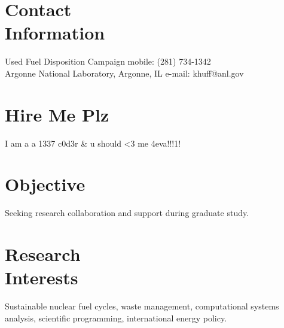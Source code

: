 \documentclass[margin,line]{resume}
\begin{document}
\begin{resume}

    \section{\mysidestyle Contact\\Information}

    Used Fuel Disposition Campaign                          \hfill mobile: (281) 734-1342           \vspace{0mm}\\\vspace{0mm}%
    Argonne National Laboratory, Argonne, IL                \hfill e-mail: khuff@anl.gov            \vspace{0mm}\\\vspace{-4.5mm}%

    \section{\mysidestyle Hire Me Plz}
        I am a a 1337 c0d3r & u should <3 me 4eva!!!1!

    \section{\mysidestyle Objective}
		Seeking research collaboration and support during graduate study.%
    \section{\mysidestyle Research\\Interests}
		Sustainable nuclear fuel cycles, waste management, computational systems analysis, scientific programming, international energy policy.%

\end{resume}
\end{document}
